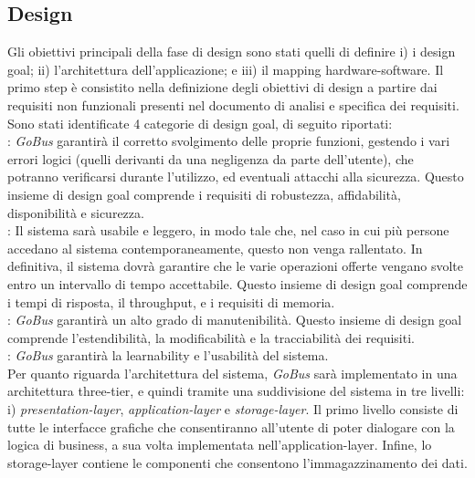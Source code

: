 \subsection{Design}
Gli obiettivi principali della fase di design sono stati quelli di definire i) i design goal; ii) l\rq architettura dell\rq applicazione; e iii) il mapping hardware-software. Il primo step \`{e} consistito nella definizione degli obiettivi di design a partire dai requisiti non funzionali presenti nel documento di analisi e specifica dei requisiti. Sono stati identificate 4 categorie di design goal, di seguito riportati:\\

:  \emph{GoBus} garantir\`{a} il corretto svolgimento delle proprie funzioni, gestendo i vari errori logici (quelli derivanti da una negligenza da parte dell’utente), che potranno verificarsi durante l’utilizzo, ed eventuali attacchi alla sicurezza. Questo insieme di design goal comprende i requisiti di robustezza, affidabilit\`{a}, disponibilit\`{a} e sicurezza.\\
:  Il sistema sar\`{a} usabile e leggero, in modo tale che, nel caso in cui più persone accedano al sistema contemporaneamente, questo non venga rallentato. In definitiva, il sistema dovr\`{a} garantire che le varie operazioni offerte vengano svolte entro un intervallo di tempo accettabile. Questo insieme di design goal comprende i tempi di risposta, il throughput, e i requisiti di memoria.\\
:  \emph{GoBus} garantir\`{a} un alto grado di manutenibilit\`{a}. Questo insieme di design goal comprende l\rq estendibilit\`{a}, la modificabilit\`{a} e la tracciabilit\`{a} dei requisiti.\\
:  \emph{GoBus} garantir\`{a} la learnability e l\rq usabilit\`{a} del sistema.\\

Per quanto riguarda l\rq architettura del sistema, \emph{GoBus} sar\`{a} implementato in una architettura three-tier, e quindi tramite una suddivisione del sistema in tre livelli: i) \emph{presentation-layer}, \emph{application-layer} e \emph{storage-layer}. Il primo livello consiste di tutte le interfacce grafiche che consentiranno all\rq utente di poter dialogare con la logica di business, a sua volta implementata nell\rq application-layer. Infine, lo storage-layer contiene le componenti che consentono l\rq immagazzinamento dei dati.\\

